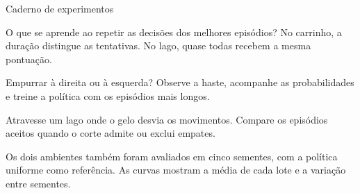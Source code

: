 Caderno de experimentos

O que se aprende ao repetir as decisões dos melhores episódios? No carrinho, a duração distingue as tentativas. No lago, quase todas recebem a mesma pontuação.

Empurrar à direita ou à esquerda? Observe a haste, acompanhe as probabilidades e treine a política com os episódios mais longos.

Atravesse um lago onde o gelo desvia os movimentos. Compare os episódios aceitos quando o corte admite ou exclui empates.

Os dois ambientes também foram avaliados em cinco sementes, com a política uniforme como referência. As curvas mostram a média de cada lote e a variação entre sementes.
